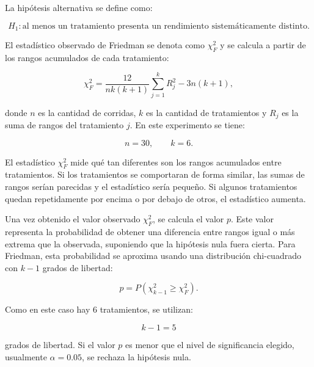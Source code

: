 \documentclass[12pt]{article}
\begin{document}
La hipótesis alternativa se define como:

\begin{equation}
H_1: \text{al menos un tratamiento presenta un rendimiento sistemáticamente distinto.}
\end{equation}

El estadístico observado de Friedman se denota como $\chi^2_F$ y se calcula a partir de los
rangos acumulados de cada tratamiento:

\begin{equation}
\chi^2_F =
\frac{12}{n k (k+1)}
\sum_{j=1}^{k} R_j^2
- 3n(k+1),
\end{equation}

donde $n$ es la cantidad de corridas, $k$ es la cantidad de tratamientos y $R_j$ es la suma de
rangos del tratamiento $j$. En este experimento se tiene:

\begin{equation}
n = 30,
\qquad
k = 6.
\end{equation}

El estadístico $\chi^2_F$ mide qué tan diferentes son los rangos acumulados entre tratamientos.
Si los tratamientos se comportaran de forma similar, las sumas de rangos serían parecidas y el
estadístico sería pequeño. Si algunos tratamientos quedan repetidamente por encima o por debajo
de otros, el estadístico aumenta.

Una vez obtenido el valor observado $\chi^2_F$, se calcula el valor $p$. Este valor representa la
probabilidad de obtener una diferencia entre rangos igual o más extrema que la observada,
suponiendo que la hipótesis nula fuera cierta. Para Friedman, esta probabilidad se aproxima
usando una distribución chi-cuadrado con $k-1$ grados de libertad:

\begin{equation}
p = P(\chi^2_{k-1} \geq \chi^2_F).
\end{equation}

Como en este caso hay 6 tratamientos, se utilizan:

\begin{equation}
k-1 = 5
\end{equation}

grados de libertad. Si el valor $p$ es menor que el nivel de significancia elegido, usualmente $
\alpha = 0.05$, se rechaza la hipótesis nula.
\end{document}
